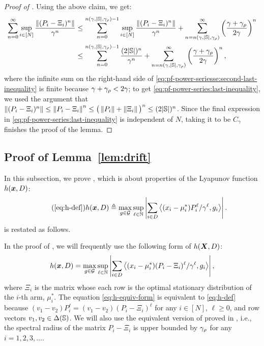 \begin{proof}[Proof of ]
    
    Using the above claim, we get:
    \begin{align}
        \label{eq:pf-power-seriesse:second-last-inequality}
         \sum_{n=0}^{\infty} \sup_{i\in[N]}\frac{\left\lVert(P_i-\Xi_i)^n\right\rVert}{\gamma^n}&\leq \sum_{n=0}^{n(\gamma,\lvert\mathbb{S}\rvert,\gamma_{\rho})-1}\sup_{i\in[N]}\frac{\left\lVert(P_i-\Xi_i)^n\right\rVert}{\gamma^n}+\sum_{n=n(\gamma,\lvert\mathbb{S}\rvert,\gamma_{\rho})}^{\infty}\left(\frac{\gamma+\gamma_{\rho}}{2\gamma}\right)^n\\
         \label{eq:pf-power-series:last-inequality}
         &\leq\sum_{n=0}^{n(\gamma,\lvert\mathbb{S}\rvert,\gamma_{\rho})-1}\frac{(2\lvert\mathbb{S}\rvert)^n}{\gamma^n} +\sum_{n=n(\gamma,\lvert\mathbb{S}\rvert,\gamma_{\rho})}^{\infty}\left(\frac{\gamma+\gamma_{\rho}}{2\gamma}\right)^n,
    \end{align}
    where the infinite sum on the right-hand side of \eqref{eq:pf-power-seriesse:second-last-inequality} is finite because $\gamma+\gamma_{\rho} < 2\gamma$;
    to get \eqref{eq:pf-power-series:last-inequality}, we used the argument that $\left\lVert(P_i-\Xi_i)^n\right\rVert \leq \left\lVert P_i-\Xi_i\right\rVert^n \leq \big(\left\lVert P_i\right\rVert+\left\lVert\Xi_i\right\rVert\big)^n \leq (2\lvert\mathbb{S}\rvert)^n$. 
    Since the final expression in \eqref{eq:pf-power-series:last-inequality} is independent of $N$, taking it to be $C_{\gamma}$ finishes the proof of the lemma. 
\end{proof}


\subsection{Proof of Lemma~\ref{lem:drift}}
\label{app:proof-lem-drift}

In this subsection, we prove , which is about properties of the Lyapunov function $h(\bm{x},D)$:
\begin{equation}\tag{\ref{eq:h-def}}
    h(\mx,D) \triangleq \max_{g\in \mathcal{G}} \sup_{\ell\in\mathbb{N}} \abs{\sum_{i\in D} \innerproduct{(x_i-\mu_i^*) P_i^{\ell} / \gamma^{\ell}}{g_i}}.
\end{equation}
 is restated as follows. 
\hproperties*

In the proof of , we will frequently use the following form of $h({\bm{X}}, D)$:  
\begin{equation}\label{eq:h-equiv-form}
    h(\bm{x},D) = \max_{g\in \mathcal{G}} \sup_{\ell\in\mathbb{N}} \left\lvert\sum_{i\in D} \left\langle (x_i-\mu_i^*) (P_i - \Xi_i)^{\ell} / \gamma^{\ell}, g_i \right\rangle\right\rvert,
\end{equation}
where $\Xi_i$ is the matrix whose each row is the optimal stationary distribution of the $i$-th arm, $\mu^*_i$. 
The equation \eqref{eq:h-equiv-form} is equivalent to \eqref{eq:h-def} because $(v_1 - v_2) P_i^\ell = (v_1-v_2) (P_i - \Xi_i)^\ell$ for any $i\in [N]$, $\ell \geq 0$, and row vectors $v_1, v_2 \in \Delta(\mathbb{S})$. We will also use the equivalent version of  proved in , i.e., the spectral radius of the matrix $P_i - \Xi_i$ is upper bounded by $\gamma_{\rho}$ for any $i=1,2,3,\dots$. 


